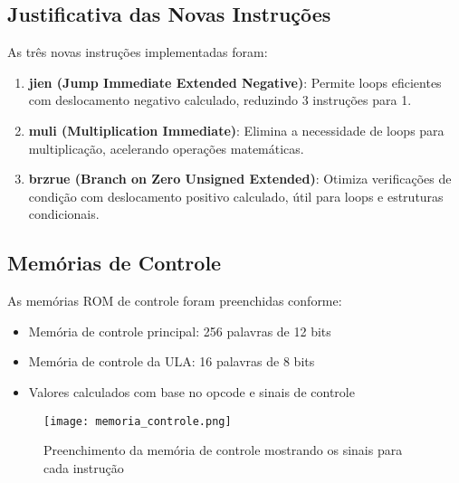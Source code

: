 \subsection{Justificativa das Novas Instruções}
As três novas instruções implementadas foram:

\begin{enumerate}
    \item \textbf{jien (Jump Immediate Extended Negative)}: Permite loops eficientes com deslocamento negativo calculado, reduzindo 3 instruções para 1.
    
    \item \textbf{muli (Multiplication Immediate)}: Elimina a necessidade de loops para multiplicação, acelerando operações matemáticas.
    
    \item \textbf{brzrue (Branch on Zero Unsigned Extended)}: Otimiza verificações de condição com deslocamento positivo calculado, útil para loops e estruturas condicionais.
\end{enumerate}

\subsection{Memórias de Controle}
As memórias ROM de controle foram preenchidas conforme:
\begin{itemize}
    \item Memória de controle principal: 256 palavras de 12 bits
    \item Memória de controle da ULA: 16 palavras de 8 bits
    \item Valores calculados com base no opcode e sinais de controle
\end{itemize}

\begin{figure}[h]
    \centering
    \texttt{[image: memoria\_controle.png]}
    \caption{Preenchimento da memória de controle mostrando os sinais para cada instrução}
    \label{fig:mem_controle}
\end{figure}
